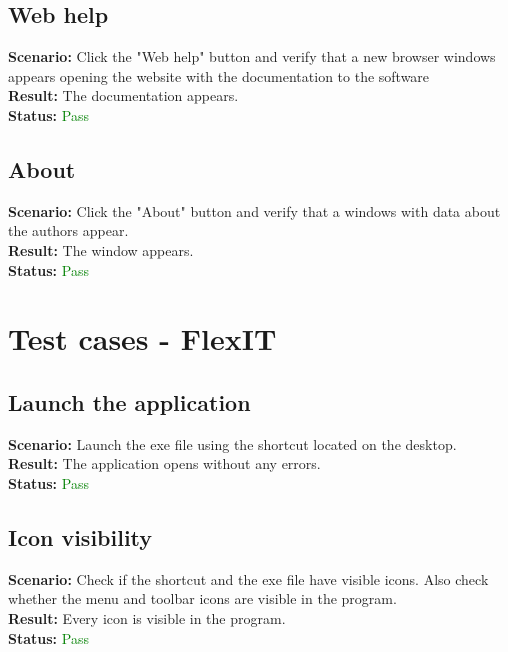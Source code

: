 \documentclass[a4paper, 11pt, article]{report}
\begin{document}
\subsection{Web help}

\noindent \textbf{Scenario:} Click the "Web help" button and verify that a new browser windows appears opening the website with the documentation to the software
\\
\noindent \textbf{Result:} The documentation appears.
\\
\noindent \textbf{Status:} \textcolor{green}{Pass}

\subsection{About}

\noindent \textbf{Scenario:} Click the "About" button and verify that a windows with data about the authors appear.
\\
\noindent \textbf{Result:} The window appears.
\\
\noindent \textbf{Status:} \textcolor{green}{Pass}

\section{Test cases - FlexIT}

\subsection{Launch the application}

\noindent \textbf{Scenario:} Launch the exe file using the shortcut located on the desktop.
\\
\noindent \textbf{Result:} The application opens without any errors.
\\
\noindent \textbf{Status:} \textcolor{green}{Pass}

\subsection{Icon visibility}

\noindent \textbf{Scenario:} Check if the shortcut and the exe file have visible icons. Also check whether the menu and toolbar icons are visible in the program.
\\
\noindent \textbf{Result:} Every icon is visible in the program.
\\
\noindent \textbf{Status:} \textcolor{green}{Pass}
\end{document}
